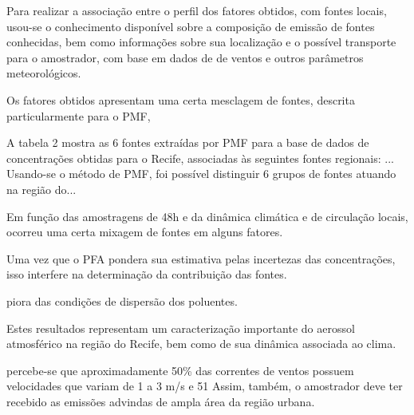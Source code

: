 Para realizar a associação entre o perfil dos fatores obtidos, com fontes locais, usou-se o conhecimento disponível sobre a composição de emissão de fontes conhecidas, bem como  informações sobre sua localização e o possível transporte para o amostrador, com base em dados de de ventos e outros parâmetros meteorológicos.

Os fatores obtidos apresentam uma certa mesclagem de fontes, descrita particularmente para o PMF,

A tabela 2 mostra as 6 fontes extraídas por PMF para a base de dados de concentrações obtidas para o Recife, associadas às seguintes fontes regionais: ...
Usando-se o método de PMF, foi possível distinguir 6 grupos de fontes atuando na região do... 



Em função das amostragens de 48h e da dinâmica climática e de circulação locais, 
ocorreu uma certa mixagem de fontes em alguns fatores. 

Uma vez que o PFA pondera sua estimativa pelas incertezas das concentrações, 
isso interfere na determinação da contribuição das fontes.

piora das condições de dispersão dos poluentes. 

Estes resultados representam um caracterização importante do aerossol atmosférico na região do Recife, bem como de sua dinâmica associada ao clima.

percebe-se que aproximadamente 50\% das correntes de ventos possuem velocidades que variam de 1 a 3 m/s e 51%
Assim, também, o amostrador deve ter recebido as emissões advindas de ampla área da região urbana. 
